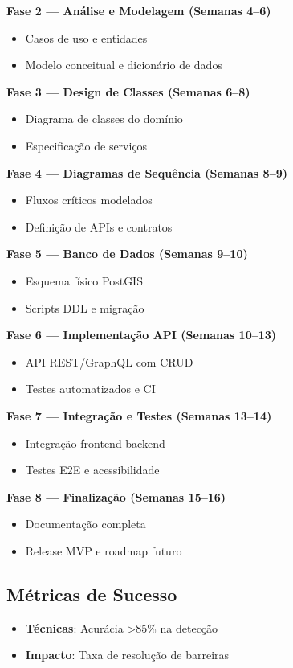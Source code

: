 \documentclass[12pt,a4paper]{article}
\begin{document}
\textbf{Fase 2 — Análise e Modelagem (Semanas 4–6)}
\begin{itemize}
    \item Casos de uso e entidades
    \item Modelo conceitual e dicionário de dados
\end{itemize}

\textbf{Fase 3 — Design de Classes (Semanas 6–8)}
\begin{itemize}
    \item Diagrama de classes do domínio
    \item Especificação de serviços
\end{itemize}

\textbf{Fase 4 — Diagramas de Sequência (Semanas 8–9)}
\begin{itemize}
    \item Fluxos críticos modelados
    \item Definição de APIs e contratos
\end{itemize}

\textbf{Fase 5 — Banco de Dados (Semanas 9–10)}
\begin{itemize}
    \item Esquema físico PostGIS
    \item Scripts DDL e migração
\end{itemize}

\textbf{Fase 6 — Implementação API (Semanas 10–13)}
\begin{itemize}
    \item API REST/GraphQL com CRUD
    \item Testes automatizados e CI
\end{itemize}

\textbf{Fase 7 — Integração e Testes (Semanas 13–14)}
\begin{itemize}
    \item Integração frontend-backend
    \item Testes E2E e acessibilidade
\end{itemize}

\textbf{Fase 8 — Finalização (Semanas 15–16)}
\begin{itemize}
    \item Documentação completa
    \item Release MVP e roadmap futuro
\end{itemize}

\subsection{Métricas de Sucesso}
\begin{itemize}
    \item \textbf{Técnicas}: Acurácia >85\% na detecção
    \item \textbf{Impacto}: Taxa de resolução de barreiras
\end{itemize}
\end{document}
